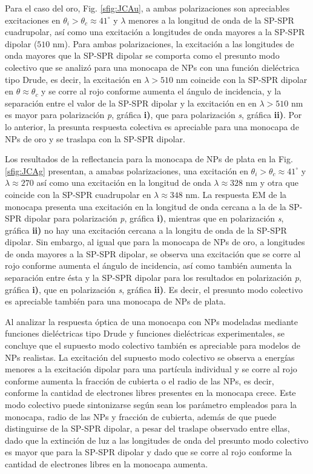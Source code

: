 Para el caso del oro, Fig. \ref{sfig:JCAu},  a ambas polarizaciones son apreciables excitaciones en $\theta_i>\theta_c \approx 41^\circ$ y  $\lambda$ menores a la longitud de onda de la SP-SPR cuadrupolar, así como una excitación a longitudes de onda mayores a la SP-SPR dipolar ($510$ nm). Para ambas polarizaciones, la excitación a las longitudes de onda mayores que la SP-SPR dipolar se comporta como el presunto modo colectivo que se analizó para una monocapa de NPs con una función dieléctrica tipo Drude, es decir, la  excitación en $\lambda>510$ nm coincide con la SP-SPR dipolar en $\theta\approx \theta_c$ y se corre al rojo conforme aumenta el ángulo de incidencia, y la separación entre el valor de la SP-SPR dipolar y la excitación en en $\lambda>510$ nm  es mayor para polarización \emph{p}, gráfica \textbf{i)}, que para polarización \emph{s}, gráfica \textbf{ii)}. Por lo anterior, la presunta respuesta colectiva es apreciable para una monocapa de NPs de oro y se traslapa con la SP-SPR dipolar.

Los resultados de la reflectancia para la monocapa de NPs de plata en la Fig. \ref{sfig:JCAg} presentan, a amabas polarizaciones, una excitación en $\theta_i>\theta_c \approx 41^\circ$ y $\lambda\approx 270$ así como una excitación en la longitud de onda $\lambda \approx 328$ nm y otra que coincide con la SP-SPR cuadrupolar en $\lambda\approx 348$ nm. La respuesta EM de la monocapa presenta una excitación en la longitud de onda cercana a la de la SP-SPR dipolar para polarización \emph{p}, gráfica \textbf{i)}, mientras que en polarización \emph{s}, gráfica \textbf{ii)} no hay una excitación cercana a la longitu de onda de la SP-SPR dipolar. Sin embargo, al igual que para la monocapa de NPs de oro, a longitudes de onda mayores a la SP-SPR dipolar, se observa una excitación que  se corre al rojo conforme aumenta el ángulo de incidencia, así como también aumenta la separación entre ésta y la SP-SPR dipolar para los resultados en polarización \emph{p}, gráfica \textbf{i)}, que en polarización \emph{s}, gráfica \textbf{ii)}. Es decir, el presunto modo colectivo es apreciable también para una monocapa de NPs de plata.

Al analizar la respuesta óptica de una monocapa con NPs modeladas mediante funciones dieléctricas tipo Drude y funciones dieléctricas experimentales, se concluye que el supuesto modo colectivo también es apreciable para modelos de NPs realistas. La excitación del supuesto modo colectivo se observa a energías menores a la excitación dipolar para una partícula individual y se corre al rojo conforme aumenta la fracción de cubierta o el radio de las NPs, es decir, conforme la cantidad de electrones libres presentes en la monocapa crece. Este modo colectivo puede sintonizarse según sean los parámetro empleados para la monocapa, radio de las NPs y fracción de cubierta, además de que puede distinguirse de la SP-SPR dipolar, a pesar del traslape observado entre ellas, dado que la extinción de luz a las longitudes de onda del presunto modo colectivo es mayor que para la SP-SPR dipolar y dado que se corre al rojo conforme la cantidad de electrones libres en la monocapa aumenta.

